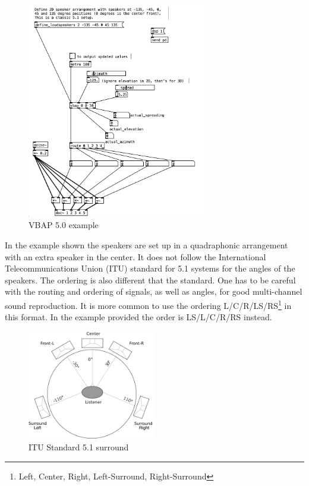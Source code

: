 \begin{figure}[ht!]%
\centering
\includegraphics[width=0.7\textwidth]{img/vbap-5.1.png} 
\caption{VBAP 5.0 example}
\label{fig:vbap-5.0}
\end{figure}

In the example shown the speakers are set up in a quadraphonic arrangement with an extra speaker in the center. It does not follow the International Telecommunications Union (ITU) standard for 5.1 systems \cite{series2010multichannel} for the angles of the speakers. The ordering is also different that the standard. One has to be careful with the routing and ordering of signals, as well as angles, for good multi-channel sound reproduction. It is more common to use the ordering L/C/R/LS/RS\footnote{Left, Center, Right, Left-Surround, Right-Surround} in this format. In the example provided the order is LS/L/C/R/RS instead. 

\begin{figure}[ht!]%
\centering
\includegraphics[width=0.5\textwidth]{img/5-1-surr.png} 
\caption{ITU Standard 5.1 surround \cite{File51su81-online}}
\label{fig:5-1-itu}
\end{figure}

